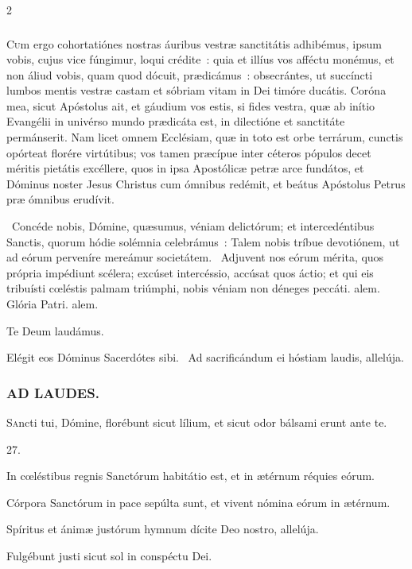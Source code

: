 \documentclass[9pt,twoside]{extarticle}
\begin{document}
\begin{multicols}{2}
{{\subsubsection*{\center {}}
\lettrine{C}um ergo cohortatiónes nostras áuribus vestræ sanctitátis adhibémus, ipsum vobis, cujus vice fúngimur, loqui crédite~: quia et illíus vos afféctu monémus, et non áliud vobis, quam quod dócuit, prædicámus~: obsecrántes, ut succíncti lumbos mentis vestræ castam et sóbriam vitam in Dei timóre ducátis. Coróna mea, sicut Apóstolus ait, et gáudium vos estis, si fides vestra, quæ ab inítio Evangélii in univérso mundo prædicáta est, in dilectióne et sanctitáte permánserit. Nam licet omnem Ecclésiam, quæ in toto est orbe terrárum, cunctis opórteat florére virtútibus; vos tamen præcípue inter céteros pópulos decet méritis pietátis excéllere, quos in ipsa Apostólicæ petræ arce fundátos, et Dóminus noster Jesus Christus cum ómnibus redémit, et beátus Apóstolus Petrus præ ómnibus erudívit.

\begin{tightlist}{}
\item {}~Concéde nobis, Dómine, quæsumus, véniam delictórum; et intercedéntibus Sanctis, quorum hódie solémnia celebrámus~: \textred{*} Talem nobis tríbue devotiónem, ut ad eórum perveníre mereámur societátem. ~Adjuvent nos eórum mérita, quos própria impédiunt scélera; excúset intercéssio, accúsat quos áctio; et qui eis tribuísti cœléstis palmam triúmphi, nobis véniam non déneges peccáti. alem. Glória Patri. alem.
\item Te Deum laudámus.
\item {} Elégit eos Dóminus Sacerdótes sibi. ~Ad sacrificándum ei hóstiam laudis, allelúja.
\end{tightlist}

\subsubsection*{\center \textsc{AD LAUDES.}}
\begin{center}\end{center}
\lettrine{S}ancti tui, Dómine, florébunt sicut lílium, et sicut odor bálsami erunt ante te.

\begin{tightlist}{}
\item {} 27.
\item {} In cœléstibus regnis Sanctórum habitátio est, et in ætérnum réquies eórum.
\item {} Córpora Sanctórum in pace sepúlta sunt, et vivent nómina eórum in ætérnum.
\item {} Spíritus et ánimæ justórum hymnum dícite Deo nostro, allelúja.
\item {} Fulgébunt justi sicut sol in conspéctu Dei.
\end{tightlist}

}}
\end{multicols}
\end{document}
